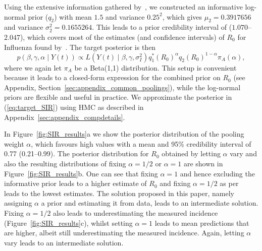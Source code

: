 \documentclass[12pt]{article}
\begin{document}
Using the extensive information gathered by~\textcite{Biggerstaff2014}, we constructed an informative log-normal prior ($q_2$) with mean $1.5$ and variance $0.25^2$, which gives $\mu_2 = 0.3917656$ and variance $\sigma_2^2 =  0.1655264$.
This leads to a prior credibility interval of ($1.070$--$2.047$), which covers most of the estimates (and confidence intervals) of $R_0$ for Influenza found by~\textcite{Biggerstaff2014}.
The target posterior is then
\begin{equation}
 \label{eq:target_SIR}
 p(\beta, \gamma, \alpha \mid Y(t)) \propto  L(Y(t)\mid \beta, \gamma, \sigma_I^2) q_1^\ast(R_0)^\alpha q_2(R_0)^{1-\alpha}\pi_A(\alpha),
\end{equation}
where we again let $\pi_A$ be a Beta(1,1) distribution.
This setup is convenient because it leads to a closed-form expression for the combined prior on $R_0$ (see Appendix, Section~\ref{sec:appendix_common_poolings}), while the log-normal priors are flexible and useful in practice.
We approximate the posterior in (\ref{eq:target_SIR}) using HMC as described in Appendix~\ref{sec:appendix_compdetails}.

In Figure~\ref{fig:SIR_results}a we show the posterior distribution of the pooling weight $\alpha$, which favours high values with a mean and 95\% credibility interval of 0.77 (0.21--0.99).
The posterior distribution for $R_0$ obtained by letting $\alpha$ vary and also the resulting distributions of fixing $\alpha = 1/2$ or $\alpha = 1$ are shown in Figure~\ref{fig:SIR_results}b.
One can see that fixing $\alpha = 1$ and hence excluding the informative prior leads to a higher estimate of $R_0$ and fixing $\alpha = 1/2$ as per~\textcite{Poole2000} leads to the lowest estimates.
The solution proposed in this paper, namely assigning $\alpha$ a prior and estimating it from data, leads to an intermediate solution.
Fixing $\alpha = 1/2$ also leads to underestimating the measured incidence (Figure~\ref{fig:SIR_results}c), whilst setting $\alpha = 1$ leads to mean predictions that are higher, albeit still underestimating the measured incidence.
Again, letting $\alpha$ vary leads to an intermediate solution.
\end{document}
